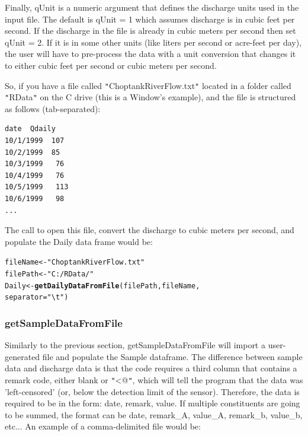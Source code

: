 \documentclass[a4paper,11pt]{article}\usepackage[]{graphicx}\usepackage[]{color}
\makeatletter
\newcommand{\hlstr}[1]{\textcolor[rgb]{0.192,0.494,0.8}{#1}}%
\newcommand{\hlstd}[1]{\textcolor[rgb]{0.345,0.345,0.345}{#1}}%
\newcommand{\hlkwb}[1]{\textcolor[rgb]{0.69,0.353,0.396}{#1}}%
\newcommand{\hlkwc}[1]{\textcolor[rgb]{0.333,0.667,0.333}{#1}}%
\newcommand{\hlkwd}[1]{\textcolor[rgb]{0.737,0.353,0.396}{\textbf{#1}}}%
\newenvironment{kframe}{%
 \def\at@end@of@kframe{}%
 \ifinner\ifhmode%
  \def\at@end@of@kframe{\end{minipage}}%
  \begin{minipage}{\columnwidth}%
 \fi\fi%
 \def\FrameCommand##1{\hskip\@totalleftmargin \hskip-\fboxsep
 \colorbox{shadecolor}{##1}\hskip-\fboxsep
     \hskip-\linewidth \hskip-\@totalleftmargin \hskip\columnwidth}%
 \MakeFramed {\advance\hsize-\width
   \@totalleftmargin\z@ \linewidth\hsize
   \@setminipage}}%
 {\par\unskip\endMakeFramed%
 \at@end@of@kframe}
\newenvironment{knitrout}{}{} %
\makeatother
\begin{document}
Finally, qUnit is a numeric argument that defines the discharge units used in the input file.  The default is qUnit = 1 which assumes discharge is in cubic feet per second.  If the discharge in the file is already in cubic meters per second then set qUnit = 2.  If it is in some other units (like liters per second or acre-feet per day), the user will have to pre-process the data with a unit conversion that changes it to either cubic feet per second or cubic meters per second.

So, if you have a file called \texttt{"}ChoptankRiverFlow.txt\texttt{"} located in a folder called \texttt{"}RData\texttt{"} on the C drive (this is a Window's example), and the file is structured as follows (tab-separated):
\begin{verbatim}
date  Qdaily
10/1/1999  107
10/2/1999  85
10/3/1999	76
10/4/1999	76
10/5/1999	113
10/6/1999	98
...
\end{verbatim}

The call to open this file, convert the discharge to cubic meters per second, and populate the Daily data frame would be:
\begin{knitrout}
\color{fgcolor}\begin{kframe}
\begin{alltt}
\hlstd{fileName} \hlkwb{<-} \hlstr{"ChoptankRiverFlow.txt"}
\hlstd{filePath} \hlkwb{<-}  \hlstr{"C:/RData/"}
\hlstd{Daily} \hlkwb{<-} \hlkwd{getDailyDataFromFile}\hlstd{(filePath,fileName,}
                    \hlkwc{separator}\hlstd{=}\hlstr{"\textbackslash{}t"}\hlstd{)}
\end{alltt}
\end{kframe}
\end{knitrout}


\FloatBarrier

\subsubsection{getSampleDataFromFile}
Similarly to the previous section, getSampleDataFromFile will import a user-generated file and populate the Sample dataframe. The difference between sample data and discharge data is that the code requires a third column that contains a remark code, either blank or \texttt{"}\verb@<@\texttt{"}, which will tell the program that the data was 'left-censored' (or, below the detection limit of the sensor). Therefore, the data is required to be in the form: date, remark, value.  If multiple constituents are going to be summed, the format can be date, remark\_A, value\_A, remark\_b, value\_b, etc... An example of a comma-delimited file would be:
\end{document}
